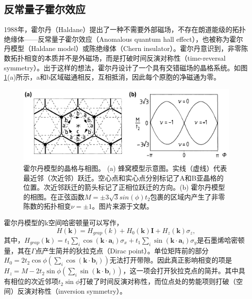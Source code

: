 \subsection{反常量子霍尔效应}
1988年，霍尔丹（Haldane）提出了一种不需要外部磁场，不存在朗道能级的拓扑绝缘体——反常量子霍尔效应（Anomalous quantum hall effect）\cite{haldane1988model}，也被称为霍尔丹模型（Haldane model）或陈绝缘体（Chern insulator）。霍尔丹意识到，非零陈数拓扑相变的本质并不是外磁场，而是打破时间反演对称性（time-reversal symmetry）。出于这样的想法，霍尔丹设计了一个具有交错磁场的晶格系统。如图\ref{fig:HaldanePaper}(a)所示，a和b区域磁通相反，互相抵消，因此每个原胞的净磁通为零。
\begin{figure}[htbp]
    \centering
    \includegraphics[width=0.75\linewidth]{figure/Introduction/HaldanePaper.png}
    \caption{霍尔丹模型的晶格与相图。 (a) 蜂窝模型示意图。实线（虚线）代表最近邻（次近邻）跃迁。空心点和实心点分别标记了A和B亚晶格的位置。次近邻跃迁的箭头标记了正相位跃迁的方向。(b) 霍尔丹模型的相图。在正弦函数$M=\pm3\sqrt{3}sin(\phi)t_2$包裹的区域内产生了非零陈数的拓扑相变$\nu=\pm1$。图片来源于文献\cite{haldane1988model}。}
    \label{fig:HaldanePaper}
\end{figure}
霍尔丹模型的k空间哈密顿量可以写作，
\begin{equation}
H(\mathbf{k}) = H_{grap}(k) + H_0(\mathbf{k}) \mathbf{I} + H_z(\mathbf{k}) \sigma_z,
\end{equation}
其中，$H_{grap}(\mathbf{k}) = t_1 \sum_i \cos(\mathbf{k} \cdot \mathbf{a}_i) \sigma_x + t_1 \sum_i \sin(\mathbf{k} \cdot \mathbf{a}_i) \sigma_y$是石墨烯哈密顿量，其在$\Gamma$点产生简并的狄拉克点（Dirac point）。单位矩阵前的部分$H_0 = 2t_2 \cos\phi \left( \sum_i \cos(\mathbf{k} \cdot \mathbf{b}_i) \right)$无法打开带隙。因此真正影响相变的项是$H_z = M - 2t_2 \sin\phi \left( \sum_i \sin(\mathbf{k} \cdot \mathbf{b}_i) \right)$，这一项会打开狄拉克点的简并。其中具有相位的次近邻项$t_2\sin\phi$打破了时间反演对称性，而位点处的势能项则打破（空间）反演对称性（inversion symmetry）。

